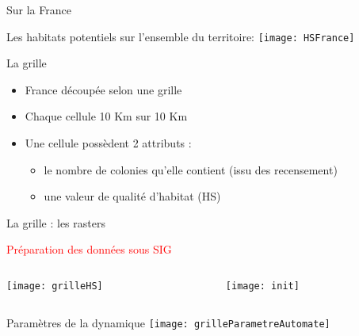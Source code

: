 \documentclass[]{beamer}
\begin{document}
 

    \begin{frame}{Sur la France}
 \begin{center}
Les habitats potentiels sur l’ensemble du territoire:
\vspace{10pt}
 \texttt{[image: HSFrance]}
\end{center}
  \end{frame}
 
 

 \begin{frame}{La grille}
  \begin{itemize}
   \item France découpée selon une grille  
 \item Chaque cellule 10 Km sur 10 Km
 \item Une cellule possèdent 2 attributs : 
\begin{itemize}
 \item le nombre de colonies qu’elle contient (issu des recensement)
 \item une valeur de qualité d’habitat (HS)
\end{itemize}
  \end{itemize}
   \end{frame}
 
  \begin{frame}{La grille : les rasters}
   \begin{center}
\textcolor{red}{Préparation des données sous SIG}\\
  \end{center}
     \begin{columns}
    \begin{column}[c]{0.5\textwidth}
\begin{center}
 \texttt{[image: grilleHS]}
\end{center}
     \end{column}
    \begin{column}[c]{0.5\textwidth}
\begin{center}

\texttt{[image: init]}
\end{center}
      \end{column}
  \end{columns}

 \end{frame}
 
 \begin{frame}{Paramètres de la dynamique}
 \texttt{[image: grilleParametreAutomate]}
 \end{frame}
\end{document}
